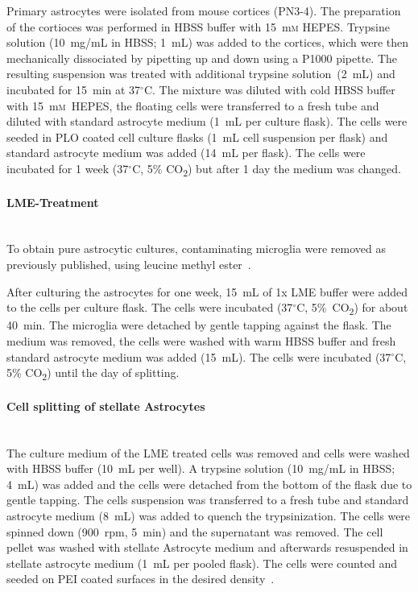\documentclass[a4paper,11pt,bibtotocnumbered]{article}
\begin{document}
Primary astrocytes were isolated from mouse cortices (PN3-4). The preparation of the cortioces was performed in HBSS  buffer with 15~m\textsc{m} HEPES. Trypsine solution (10~mg/mL in HBSS; 1~mL) was added to the cortices, which were then mechanically dissociated by pipetting up and down using a P1000 pipette. The resulting suspension was treated with additional trypsine solution~(2~mL) and incubated for 15~min at 37$^\circ$C. The mixture was diluted with cold HBSS buffer with 15~m\textsc{m}~HEPES, the floating cells were transferred to a fresh tube and diluted with standard astrocyte medium (1~mL per culture flask). The cells were seeded in PLO coated cell culture flasks (1~mL cell suspension per flask) and standard astrocyte medium was added (14~mL per flask). The cells were incubated for 1 week (37$^\circ$C, 5\% CO\textsubscript{2}) but after 1 day the medium was changed.  



\paragraph{LME-Treatment} $~$ \\

To obtain pure astrocytic cultures, contaminating microglia were removed as previously published, using leucine methyl ester~\cite{Jebelli2015}.

After culturing the astrocytes for one week, 15~mL of 1x LME buffer were added to the cells per culture flask. The cells were incubated (37$^\circ$C, 5\%~CO\textsubscript{2}) for about 40~min. The microglia were detached by gentle tapping against the flask. The medium was removed, the cells were washed with warm HBSS buffer and fresh standard astrocyte medium was added (15~mL). The cells were incubated (37$^\circ$C, 5\% CO\textsubscript{2}) until the day of splitting.


\paragraph{Cell splitting of stellate Astrocytes} $~$ \\

The culture medium of the LME treated cells was removed and cells were washed with HBSS buffer (10~mL per well). A trypsine solution (10~mg/mL in HBSS; 4~mL) was added and the cells were detached from the bottom of the flask due to gentle tapping. The cells suspension was transferred to a fresh tube and standard astrocyte medium (8~mL) was added to quench the trypsinization. The cells were spinned down (900~rpm, 5~min) and the supernatant was removed. The cell pellet was washed with stellate Astrocyte medium and afterwards resuspended in stellate astrocyte medium (1~mL per pooled flask). The cells were counted and seeded on PEI coated surfaces in the desired density~\cite{Wolfes2018}.
\end{document}
